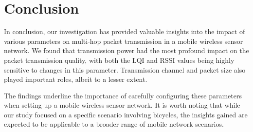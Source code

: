 \documentclass[runningheads]{llncs}
\begin{document}
\section{Conclusion}

In conclusion, our investigation has provided valuable insights into the impact of various parameters on multi-hop packet transmission in a mobile wireless sensor network. We found that transmission power had the most profound impact on the packet transmission quality, with both the LQI and RSSI values being highly sensitive to changes in this parameter. Transmission channel and packet size also played important roles, albeit to a lesser extent.

The findings underline the importance of carefully configuring these parameters when setting up a mobile wireless sensor network. It is worth noting that while our study focused on a specific scenario involving bicycles, the insights gained are expected to be applicable to a broader range of mobile network scenarios.

%
%
%
% 
% 
%



\end{document}

